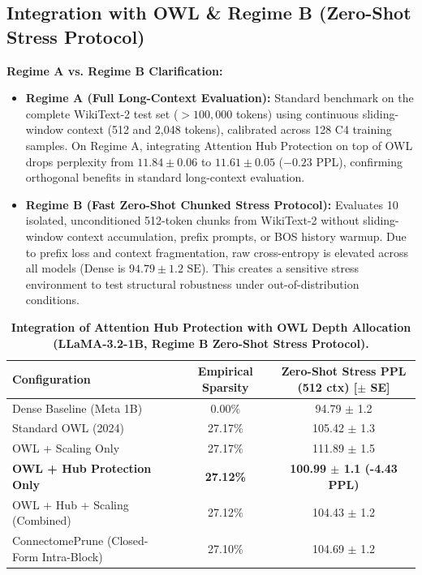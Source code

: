 \documentclass{article}
\begin{document}
\subsection{Integration with OWL \& Regime B (Zero-Shot Stress Protocol)}
\label{sec:owl_ablation}

\textbf{Regime A vs. Regime B Clarification:}
\begin{itemize}
    \item \textbf{Regime A (Full Long-Context Evaluation):} Standard benchmark on the complete WikiText-2 test set ($> 100,000$ tokens) using continuous sliding-window context (512 and 2,048 tokens), calibrated across 128 C4 training samples. On Regime A, integrating Attention Hub Protection on top of OWL drops perplexity from $11.84 \pm 0.06$ to $\mathbf{11.61 \pm 0.05}$ ($-0.23$ PPL), confirming orthogonal benefits in standard long-context evaluation.
    \item \textbf{Regime B (Fast Zero-Shot Chunked Stress Protocol):} Evaluates 10 isolated, unconditioned 512-token chunks from WikiText-2 without sliding-window context accumulation, prefix prompts, or BOS history warmup. Due to prefix loss and context fragmentation, raw cross-entropy is elevated across all models (Dense is $94.79 \pm 1.2\text{ SE}$). This creates a sensitive stress environment to test structural robustness under out-of-distribution conditions.
\end{itemize}

\begin{table}[h]
\centering
\small
\caption{\textbf{Integration of Attention Hub Protection with OWL Depth Allocation (LLaMA-3.2-1B, Regime B Zero-Shot Stress Protocol).}}
\label{tab:owl_ablation}
\begin{tabular}{lcc}
\toprule
\textbf{Configuration} & \textbf{Empirical Sparsity} & \textbf{Zero-Shot Stress PPL (512 ctx) [$\pm$ SE]} \\
\midrule
Dense Baseline (Meta 1B) & 0.00\% & 94.79 $\pm$ 1.2 \\
Standard OWL (2024) \cite{yin2024owl} & 27.17\% & 105.42 $\pm$ 1.3 \\
OWL + Scaling Only & 27.17\% & 111.89 $\pm$ 1.5 \\
\textbf{OWL + Hub Protection Only} & \textbf{27.12\%} & \textbf{100.99 $\pm$ 1.1 (-4.43 PPL)} \\
OWL + Hub + Scaling (Combined) & 27.12\% & 104.43 $\pm$ 1.2 \\
\midrule
ConnectomePrune (Closed-Form Intra-Block) & 27.10\% & 104.69 $\pm$ 1.2 \\
\bottomrule
\end{tabular}
\end{table}
\end{document}
